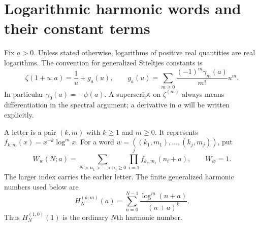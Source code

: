 \documentclass[11pt]{article}
\numberwithin{equation}{section}
\theoremstyle{definition}
\begin{document}
\section{Logarithmic harmonic words and their constant terms}
\label{sec:regularization}
Fix $a>0$. Unless stated otherwise, logarithms of positive real quantities
are real logarithms. The convention for generalized Stieltjes constants is
\begin{equation}\label{eq:stieltjes}
 \zeta(1+u,a)=\frac1u+g_a(u),\qquad
 g_a(u)=\sum_{m\ge0}\frac{(-1)^m\gamma_m(a)}{m!}u^m.
\end{equation}
In particular $\gamma_0(a)=-\psi(a)$. A superscript on $\zeta^{(m)}$
always means differentiation in the spectral argument; a derivative in
$a$ will be written explicitly.

A letter is a pair $(k,m)$ with $k\ge1$ and $m\ge0$. It represents
$f_{k,m}(x)=x^{-k}\log^m x$. For a word
$w=((k_1,m_1),\ldots,(k_j,m_j))$, put
\begin{equation}\label{eq:finite-word}
 W_w(N;a)=\sum_{N>n_1>\cdots>n_j\ge0}
             \prod_{i=1}^j f_{k_i,m_i}(n_i+a),\qquad W_\varnothing=1.
\end{equation}
The larger index carries the earlier letter. The finite generalized
harmonic numbers used below are
\begin{equation}\label{eq:harmonic}
 H_N^{(k,m)}(a)=\sum_{n=0}^{N-1}\frac{\log^m(n+a)}{(n+a)^k}.
\end{equation}
Thus $H_N^{(1,0)}(1)$ is the ordinary $N$th harmonic number.
\end{document}
